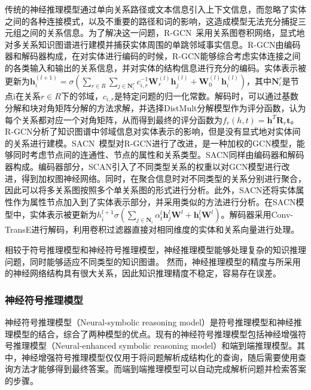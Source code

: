 \documentclass[algorithmlist, AutoFakeBold, AutoFakeSlant, figurelist, tablelist, nomlist, engineering, openany]{seuthesix} %
\begin{document}
传统的神经推理模型通过单向关系路径或文本信息引入上下文信息，而忽略了实体之间的各种连接模式，以及不重要的路径和词的影响，这造成模型无法充分捕捉三元组之间的关系信息。为了解决这一问题，R-GCN~\cite{schlichtkrull2018modeling}采用关系图卷积网络，显式地对多关系知识图谱进行建模并捕获实体周围的单跳邻域事实信息。R-GCN由编码器和解码器构成，在对实体进行编码的时候，R-GCN能够综合考虑实体连接之间的各类输入和输出的关系信息，并对实体的结构信息进行充分的编码。实体表示被更新为$\bm{h}_i^{(l+1)}=\sigma\left(\sum_{r \in R} \sum_{j \in \mathbf{N}_i^r} c_{i, r}^{-1} \mathbf{W}_r^{(l)} \bm{h}_j^{(l)}+\mathbf{W}_0^{(l)} \bm{h}_i^{(l)}\right)$，其中$\mathbf{N}_i^r$是节点i在关系$r \in R$下的邻域，$c_{i,r}$是特定问题的归一化常数。解码时，可以通过基数分解和块对角矩阵分解的方法求解，并选择DistMult分解模型作为评分函数，认为每个关系都对应一个对角矩阵，从而得到最终的评分函数为$f_r(h, t)=\bm{h}^T \mathbf{R}_r \bm{t}$。R-GCN分析了知识图谱中邻域信息对实体表示的影响，但是没有显式地对实体间的关系进行建模。SACN~\cite{shang2019end}模型对R-GCN进行了改进，是一种加权的GCN模型，能够同时考虑节点间的连通性、节点的属性和关系类型。SACN同样由编码器和解码器构成。编码器部分，SCAN引入了不同类型关系的权重以对GCN模型进行改进，得到加权图神经网络。同时，在聚合信息时对不同类型的关系分别进行聚合，因此可以将多关系图按照多个单关系图的形式进行分析。此外，SACN还将实体属性作为属性节点加入到了实体表示部分，并采用类似的方法进行分析。在SACN模型中，实体表示被更新为$h_i^{l+1}\sigma\left(\sum_{j \in \mathbf{N}_i} \alpha_t^l \bm{h}_j^l \mathbf{W}^l+\bm{h}_i^l \mathbf{W}^l\right)$。解码器采用Conv-TransE进行解码，利用卷积过滤器直接对相同维度的实体和关系向量进行处理。

相较于符号推理模型和神经符号推理模型，神经推理模型能够处理复杂的知识推理问题，同时能够适应不同类型的知识图谱。
然而，神经推理模型的精度与所采用的神经网络结构具有很大关系，因此知识推理精度不稳定，容易存在误差。

\subsubsection{神经符号推理模型}
神经符号推理模型（Neural-symbolic reasoning model）是符号推理模型和神经推理模型的结合，综合了两种模型的优点。现有的神经符号推理模型包括神经增强符号推理模型（Neural-enhanced symbolic reasoning model）和端到端推理模型。其中，神经增强符号推理模型仅仅用于将问题解析成结构化的查询，随后需要使用查询方法才能够得到最终答案。而端到端推理模型可以自动完成解析问题并检索答案的步骤。
\end{document}
